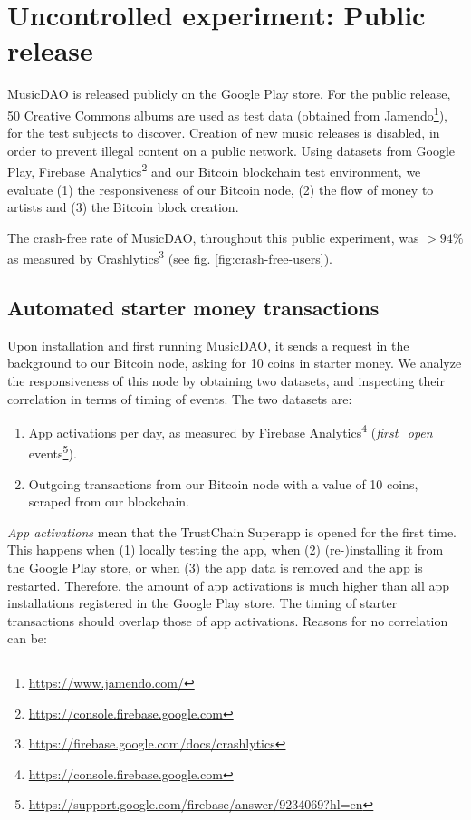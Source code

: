 \section{Uncontrolled experiment: Public release}
MusicDAO is released publicly on the Google Play store. For the public release, 50 Creative Commons albums are used as test data (obtained from Jamendo\footnote{\url{https://www.jamendo.com/}}), for the test subjects to discover. Creation of new music releases is disabled, in order to prevent illegal content on a public network. Using datasets from Google Play, Firebase Analytics\footnote{\url{https://console.firebase.google.com}} and our Bitcoin blockchain test environment, we evaluate (1) the responsiveness of our Bitcoin node, (2) the flow of money to artists and (3) the Bitcoin block creation.

The crash-free rate of MusicDAO, throughout this public experiment, was $>94\%$ as measured by Crashlytics\footnote{\url{https://firebase.google.com/docs/crashlytics}} (see fig. \ref{fig:crash-free-users}). 

\subsection{Automated starter money transactions}
\label{chap:starter-money-flow}
Upon installation and first running MusicDAO, it sends a request in the background to our Bitcoin node, asking for 10 coins in starter money. We analyze the responsiveness of this node by obtaining two datasets, and inspecting their correlation in terms of timing of events. The two datasets are: 
\begin{enumerate}
    \item App activations per day, as measured by Firebase Analytics\footnote{\url{https://console.firebase.google.com}} (\textit{first\_open} events\footnote{\url{https://support.google.com/firebase/answer/9234069?hl=en}}).
    \item Outgoing transactions from our Bitcoin node with a value of 10 coins, scraped from our blockchain.
\end{enumerate}

\textit{App activations} mean that the TrustChain Superapp is opened for the first time. This happens when (1) locally testing the app, when (2) (re-)installing it from the Google Play store, or when (3) the app data is removed and the app is restarted. Therefore, the amount of app activations is much higher than all app installations registered in the Google Play store. The timing of starter transactions should overlap those of app activations. Reasons for no correlation can be:

